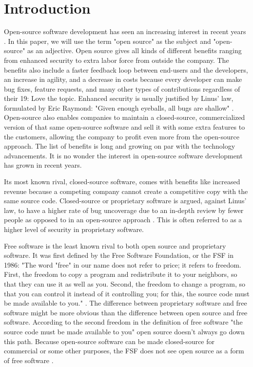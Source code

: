 \documentclass[conference]{IEEEtran}
\begin{document}
\section{Introduction}
Open-source software development has seen an increasing interest in recent years \cite{openvsclosed}. In this paper, we will use the term "open source" as the subject and "open-source" as an adjective. Open source gives all kinds of different benefits ranging from enhanced security to extra labor force from outside the company. The benefits also include a faster feedback loop between end-users and the developers, an increase in agility, and a decrease in costs because every developer can make bug fixes, feature requests, and many other types of contributions regardless of their 19: Love the topic. Enhanced security is usually justified by Linus' law, formulated by Eric Raymond: "Given enough eyeballs, all bugs are shallow" \cite{raymond1999cathedral}.
Open-source also enables companies to maintain a closed-source, commercialized version of that same open-source software and sell it with some extra features to the customers, allowing the company to profit even more from the open-source approach. The list of benefits is long and growing on par with the technology advancements. It is no wonder the interest in open-source software development has grown in recent years.

Its most known rival, closed-source software, comes with benefits like increased revenue because a competing company cannot create a competitive copy with the same source code. Closed-source or proprietary software is argued, against Linus' law, to have a higher rate of bug uncoverage due to an in-depth review by fewer people as opposed to in an open-source approach \cite{leblanc2002writing}. This is often referred to as a higher level of security in proprietary software.

Free software is the least known rival to both open source and proprietary software. It was first defined by the Free Software Foundation, or the FSF in 1986: "The word "free" in our name does not refer to price; it refers to freedom.  First, the freedom to copy a program and redistribute it to your neighbors, so that they can use it as well as you.  Second, the freedom to change a program, so that you can control it instead of it controlling you; for this, the source code must be made available to you." \cite{bull1}. The difference between proprietary software and free software might be more obvious than the difference between open source and free software. According to the second freedom in the definition of free software "the source code must be made available to you" open source doesn't always go down this path. Because open-source software can be made closed-source for commercial or some other purposes, the FSF does not see open source as a form of free software \cite{stallman2002free}.
\end{document}

